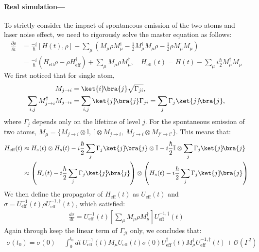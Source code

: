 \documentclass[11pt]{article}
\begin{document}
\paragraph*{Real simulation---\!\!\!}
To strictly consider the impact of spontaneous emission of the two atoms and laser noise effect, we need to rigorously solve the master equation as follows:
\begin{align}
\frac{\partial \rho}{\partial t} &= \frac{-i}{\hbar} [H(t), \rho] + \sum_\mu ( M_\mu \rho M_\mu^\dagger - \frac{1}{2} M_\mu^\dagger M_\mu \rho - \frac{1}{2} \rho M_\mu^\dagger M_\mu ) \\
&=\frac{-i}{\hbar} (H_{\text{eff}}\rho - \rho H_{\text{eff}}^\dagger)+ \sum_\mu M_\mu \rho M_\mu^\dagger , \quad H_{\text{eff}}(t) = H(t) - \sum_{\mu}i\frac{\hbar}{2} M_\mu^\dagger M_\mu
\end{align}
 We first noticed that for single atom,
\begin{align}
M_{j \to i} &= \ket{i}\!\bra{j} \sqrt{\Gamma_{ji}},\\
 \sum_{i,j}M_{j \to i}^\dagger M_{j \to i} &= \sum_{i,j}\ket{j}\!\bra{j} \Gamma_{ji} = \sum_{j} \Gamma_j \ket{j}\!\bra{j},
\end{align}
where $\Gamma_j$ depends only on the lifetime of level $j$. For the spontaneous emission of two atoms, $M_{\mu} = \{M_{j \to i} \otimes \mathbb{I},~ \mathbb{I} \otimes M_{j \to i},~ M_{j \to i} \otimes M_{j' \to i'}\}$. This means that:
\begin{align}
    H_{\text{eff}}(t) &\approx H_{s}(t) \otimes H_{s}(t) -i\frac{\hbar}{2} \sum_{j} \Gamma_j \ket{j}\!\bra{j} \otimes \mathbb{I} -i\frac{\hbar}{2}   \mathbb{I} \otimes \sum_{j} \Gamma_j \ket{j}\!\bra{j} \\
    &\approx \left( H_{s}(t)-i\frac{\hbar}{2} \sum_{j} \Gamma_j \ket{j}\!\bra{j} \right) \otimes \left( H_{s}(t)-i\frac{\hbar}{2} \sum_{j} \Gamma_j \ket{j}\!\bra{j} \right)
\end{align}
We then define the propagator of $H_{\text{eff}}(t)$ as $U_{\text{eff}}(t)$ and $\sigma = U^{-1}_{\text{eff}}(t)\rho U^{-1,\dagger}_{\text{eff}}(t) $, which satisfied:
\begin{align}
    \frac{d \sigma}{dt} =U^{-1}_{\text{eff}}(t) \left[\sum_{\mu} M_\mu \rho M_\mu^{\dagger}\right] U_{\text{eff}}^{-1,\dagger}(t)
\end{align}
Again through keep the linear term of  $\Gamma_{ji}$ only, we concludes that:
\begin{align}
    \sigma(t_0) = \sigma(0) + \int_0^{t_0} \!dt~U^{-1}_{\text{eff}}(t)  M_\mu U_{\text{eff}}(t)  \sigma(0) U^{\dagger}_{\text{eff}}(t)  M_{\mu}^\dagger U_{\text{eff}}^{-1,\dagger}(t) + \mathcal{O}(\Gamma^2)
\end{align}
\end{document}

